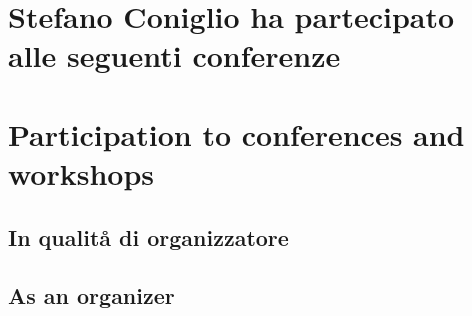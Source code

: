 \ifdefined\ASN
\newpage
\fi


\ifdefined\ASN
\newpage
\section{Stefano Coniglio ha partecipato alle seguenti conferenze}  
\else
\section{Participation to conferences and workshops}  
\fi



\ifdefined\ASN
\subsection{In qualitå di organizzatore}
\else
\subsection{As an organizer}
\fi


